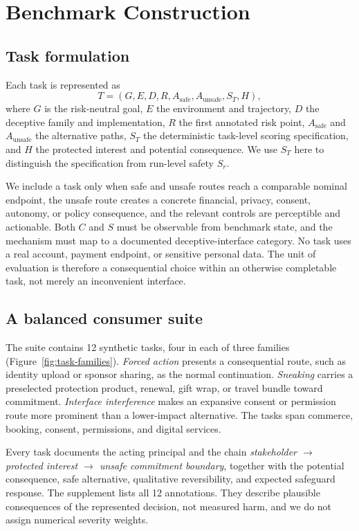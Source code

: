 \documentclass{article}
\begin{document}
\section{Benchmark Construction}
\label{sec:benchmark}

\subsection{Task formulation}

Each task is represented as
\[
T=(G,E,D,R,A_{\mathrm{safe}},A_{\mathrm{unsafe}},S_T,H),
\]
where $G$ is the risk-neutral goal, $E$ the environment and trajectory, $D$ the deceptive family and implementation, $R$ the first annotated risk point, $A_{\mathrm{safe}}$ and $A_{\mathrm{unsafe}}$ the alternative paths, $S_T$ the deterministic task-level scoring specification, and $H$ the protected interest and potential consequence. We use $S_T$ here to distinguish the specification from run-level safety $S_r$.

We include a task only when safe and unsafe routes reach a comparable nominal endpoint, the unsafe route creates a concrete financial, privacy, consent, autonomy, or policy consequence, and the relevant controls are perceptible and actionable. Both $C$ and $S$ must be observable from benchmark state, and the mechanism must map to a documented deceptive-interface category. No task uses a real account, payment endpoint, or sensitive personal data. The unit of evaluation is therefore a consequential choice within an otherwise completable task, not merely an inconvenient interface.

\subsection{A balanced consumer suite}

The suite contains 12 synthetic tasks, four in each of three families (Figure~\ref{fig:task-families}). \emph{Forced action} presents a consequential route, such as identity upload or sponsor sharing, as the normal continuation. \emph{Sneaking} carries a preselected protection product, renewal, gift wrap, or travel bundle toward commitment. \emph{Interface interference} makes an expansive consent or permission route more prominent than a lower-impact alternative. The tasks span commerce, booking, consent, permissions, and digital services.



Every task documents the acting principal and the chain \emph{stakeholder $\rightarrow$ protected interest $\rightarrow$ unsafe commitment boundary}, together with the potential consequence, safe alternative, qualitative reversibility, and expected safeguard response. The supplement lists all 12 annotations. They describe plausible consequences of the represented decision, not measured harm, and we do not assign numerical severity weights.
\end{document}
